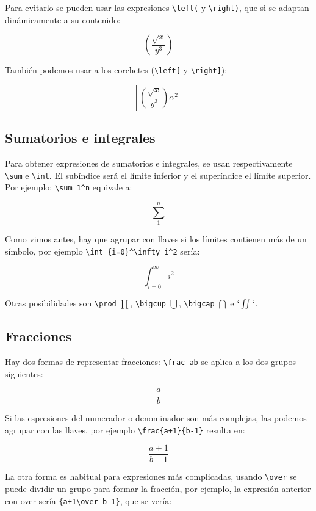 \documentclass[11pt]{article}
\begin{document}
Para evitarlo se pueden usar las expresiones
\texttt{\textbackslash{}left(} y \texttt{\textbackslash{}right)}, que si
se adaptan dinámicamente a su contenido:

\[ \left(\frac{\sqrt x}{y^3}\right) \]

También podemos usar a los corchetes (\texttt{\textbackslash{}left{[}} y
\texttt{\textbackslash{}right{]}}):

\[ \left[ \left(\frac{\sqrt x}{y^3}\right) \alpha^2 \right] \]

    \subsection{Sumatorios e integrales}\label{sumatorios-e-integrales}

Para obtener expresiones de sumatorios e integrales, se usan
respectivamente \texttt{\textbackslash{}sum} e
\texttt{\textbackslash{}int}. El subíndice será el límite inferior y el
superíndice el límite superior. Por ejemplo:
\texttt{\textbackslash{}sum\_1\^{}n} equivale a:

\[ \sum_1^n \]

Como vimos antes, hay que agrupar con llaves si los límites contienen
más de un símbolo, por ejemplo
\texttt{\textbackslash{}int\_\{i=0\}\^{}\textbackslash{}infty\ i\^{}2}
sería:

\[ \int_{i=0}^\infty i^2 \]

Otras posibilidades son \texttt{\textbackslash{}prod} \(\prod\),
\texttt{\textbackslash{}bigcup} \(\bigcup\),
\texttt{\textbackslash{}bigcap} \(\bigcap\) e \(`\iint`\).

    \subsection{Fracciones}\label{fracciones}

Hay dos formas de representar fracciones:
\texttt{\textbackslash{}frac\ ab} se aplica a los dos grupos siguientes:

\[\frac ab\]

Si las espresiones del numerador o denominador son más complejas, las
podemos agrupar con las llaves, por ejemplo
\texttt{\textbackslash{}frac\{a+1\}\{b-1\}} resulta en:

\[ \frac {a+1} {b-1} \]

La otra forma es habitual para expresiones más complicadas, usando
\texttt{\textbackslash{}over} se puede dividir un grupo para formar la
fracción, por ejemplo, la expresión anterior con over sería
\texttt{\{a+1\textbackslash{}over\ b-1\}}, que se vería:
\end{document}
